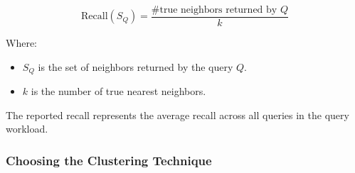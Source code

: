 \begin{equation}
    \text{Recall}(S_Q) = \frac{\# \text{true neighbors returned by } Q}{k}
    \label{eq:recall}
\end{equation}

Where:
\begin{itemize}
    \item \( S_Q \) is the set of neighbors returned by the query \( Q \).
    \item \( k \) is the number of true nearest neighbors.
\end{itemize}

The reported recall represents the average recall across all queries in the query workload.



\subsubsection{Choosing the Clustering Technique} 



